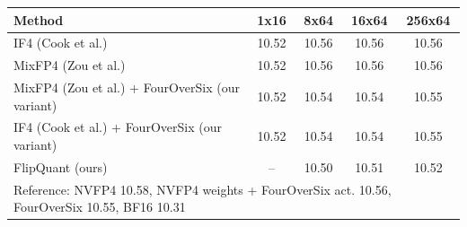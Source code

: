\begin{tabular}{lcccc}
\toprule
Method & 1x16 & 8x64 & 16x64 & 256x64 \\
\midrule
IF4 (Cook et al.) & 10.52 & 10.56 & 10.56 & 10.56 \\
MixFP4 (Zou et al.) & 10.52 & 10.56 & 10.56 & 10.56 \\
MixFP4 (Zou et al.) + FourOverSix (our variant) & 10.52 & 10.54 & 10.54 & 10.55 \\
IF4 (Cook et al.) + FourOverSix (our variant) & 10.52 & 10.54 & 10.54 & 10.55 \\
FlipQuant (ours) & -- & 10.50 & 10.51 & 10.52 \\
\midrule
\multicolumn{5}{l}{\footnotesize Reference: NVFP4 10.58, NVFP4 weights + FourOverSix act. 10.56, FourOverSix 10.55, BF16 10.31} \\
\bottomrule
\end{tabular}
